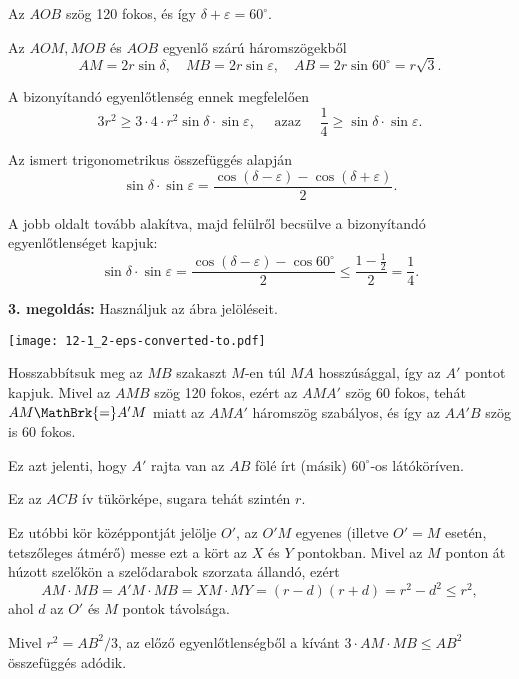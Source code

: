 \documentclass[a4paper,10pt]{article}
\begin{document}
\noindent Az $AOB$ szög 120 fokos, és így $\delta+\varepsilon=60^\circ$.

\smallskip

\noindent Az $AOM, MOB$ és $AOB$ egyenlő szárú háromszögekből
\[AM=2r\sin\delta,\quad MB=2r\sin\varepsilon,\quad AB=2r\sin 60^\circ=r\sqrt
3.\]


\noindent A bizonyítandó egyenlőtlenség ennek megfelelően
\[3r^2\ge 3\cdot4\cdot r^2\sin\delta\cdot\sin\varepsilon,\quad\text{ azaz }\quad {\frac14}\ge \sin\delta\cdot\sin\varepsilon.\]

\noindent Az ismert trigonometrikus összefüggés alapján
\[\sin\delta\cdot\sin\varepsilon=\frac{\cos(\delta-\varepsilon)-\cos(\delta+\varepsilon)
}2.\]


\noindent A jobb oldalt tovább alakítva, majd felülről becsülve a bizonyítandó egyenlőtlenséget kapjuk:
\[\sin\delta\cdot\sin\varepsilon=\frac{\cos(\delta-\varepsilon)-\cos 60^\circ}2\le \frac{1-\frac12}2=\frac14.\]


\medskip

{\bf 3. megoldás:} Használjuk az ábra jelöléseit.

\begin{center}
\texttt{[image: 12-1\_2-eps-converted-to.pdf]}
\end{center}

\noindent Hosszabbítsuk meg az $MB$ szakaszt $M$-en túl $MA$ hosszúsággal, így az $A'$
pontot kapjuk. Mivel az $AMB$ szög 120 fokos, ezért az $AMA'$ szög 60 fokos,
tehát $AM\MathBrk{=}A'M$ miatt az $AMA'$ háromszög szabályos, és így az $AA'B$ szög is
60 fokos. 

\smallskip

\noindent Ez azt jelenti, hogy $A'$ rajta van az $AB$ fölé írt (másik) $60^\circ$-os
látóköríven. 

\smallskip

\noindent Ez az $ACB$ ív tükörképe, sugara tehát szintén $r$. 

\smallskip

\noindent Ez utóbbi kör középpontját jelölje $O'$, az $O'M$ egyenes (illetve $O'=M$
esetén, tetszőleges átmérő) messe ezt a kört az
$X$ és $Y$ pontokban. Mivel az $M$ ponton át húzott szelőkön a szelődarabok szorzata állandó, ezért
\[AM\cdot MB=A'M\cdot MB=XM\cdot MY=(r-d)(r+d)=r^2-d^2\le r^2,\]
ahol $d$ az $O'$ és $M$ pontok távolsága.

\smallskip

\noindent Mivel $r^2=AB^2/3$, az előző egyenlőtlenségből a kívánt $3\cdot
AM\cdot MB\le AB^2$ összefüggés adódik.
\end{document}
